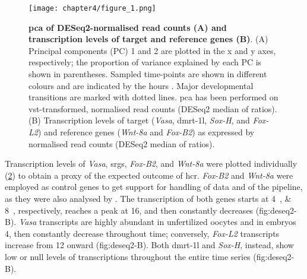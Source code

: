\begingroup
\captionsetup[figure]{format=hruleformat}
\begin{figure}[t!]
	\centering
	\captionsetup[subfigure]{labelformat=nocaption}
	\begin{subfigure}{0\linewidth}
	\caption{}\label{fig:deseq2-A}
	\end{subfigure}%
	\begin{subfigure}{0\linewidth}
	\caption{}\label{fig:deseq2-B}
	\end{subfigure}%
    \texttt{[image: chapter4/figure\_1.png]}
	\caption[\textbf{\gls{pca} of DESeq2-normalised read counts (A) and transcription levels of target and reference genes (B)}]
	{
		\textbf{\gls{pca} of DESeq2-normalised read counts (A) and transcription levels of target and reference genes (B)}. (A) Principal components (PC) 1 and 2 are plotted in the x and y axes, respectively; the proportion of variance explained by each PC is shown in parentheses. Sampled time-points are shown in different colours and are indicated by the hours . Major developmental transitions are marked with dotted lines. \gls{pca} has been performed on vst-transformed, normalised read counts (DESeq2 median of ratios). (B) Transcription levels of target (\textit{Vasa}, \gls{dmrt-1l}, \textit{Sox-H}, and \textit{Fox-L2}) and reference genes (\textit{Wnt-8a} and \textit{Fox-B2}) as expressed by normalised read counts (DESeq2 median of ratios).
	}
	\label{fig:deseq2}
\end{figure}
\endgroup

Transcription levels of \textit{Vasa}, \glspl{srg}, \textit{Fox-B2}, and \textit{Wnt-8a} were plotted individually (\cref{fig:deseq2-B}) to obtain a proxy of the expected outcome of \gls{hcr}. \textit{Fox-B2} and \textit{Wnt-8a} were employed as control genes to get support for handling of data and of the pipeline, as they were also analysed by . The transcription of both genes starts at \qtylist{4;8}{\hpf}, respectively, reaches a peak at \qty{16}{\hpf}, and then constantly decreases ({fig:deseq2-B}). \textit{Vasa} transcripts are highly abundant in unfertilized oocytes and in embryos \qty{4}{\hpf}, then constantly decrease throughout time; conversely, \textit{Fox-L2} transcripts increase from \qty{12}{\hpf} onward ({fig:deseq2-B}). Both \gls{dmrt-1l} and \textit{Sox-H}, instead, show low or null levels of transcriptions throughout the entire time series ({fig:deseq2-B}).

